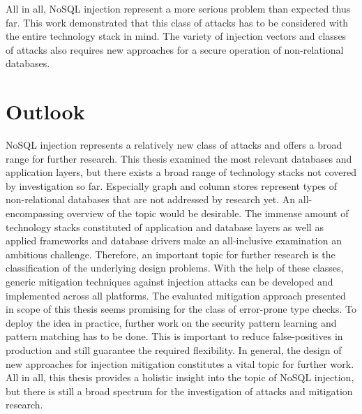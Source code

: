 All in all, NoSQL injection represent a more serious problem than expected thus far. This work demonstrated that this class of attacks has to be considered with the entire technology stack in mind. The variety of injection vectors and classes of attacks also requires new approaches for a secure operation of non-relational databases. 

\section{Outlook}
NoSQL injection represents a relatively new class of attacks and offers a broad range for further research. This thesis examined the most relevant databases and application layers, but there exists a broad range of technology stacks not covered by investigation so far. Especially graph and column stores represent types of non-relational databases that are not addressed by research yet. An all-encompassing overview of the topic would be desirable. The immense amount of technology stacks constituted of application and database layers as well as applied frameworks and database drivers make an all-inclusive examination an ambitious challenge. Therefore, an important topic for further research is the classification of the underlying design problems. With the help of these classes, generic mitigation techniques against injection attacks can be developed and implemented across all platforms. The evaluated mitigation approach presented in scope of this thesis seems promising for the class of error-prone type checks. To deploy the idea in practice, further work on the security pattern learning and pattern matching has to be done. This is important to reduce false-positives in production and still guarantee the required flexibility. In general, the design of new approaches for injection mitigation constitutes a vital topic for further work. All in all, this thesis provides a holistic insight into the topic of NoSQL injection, but there is still a broad spectrum for the investigation of attacks and mitigation research. 